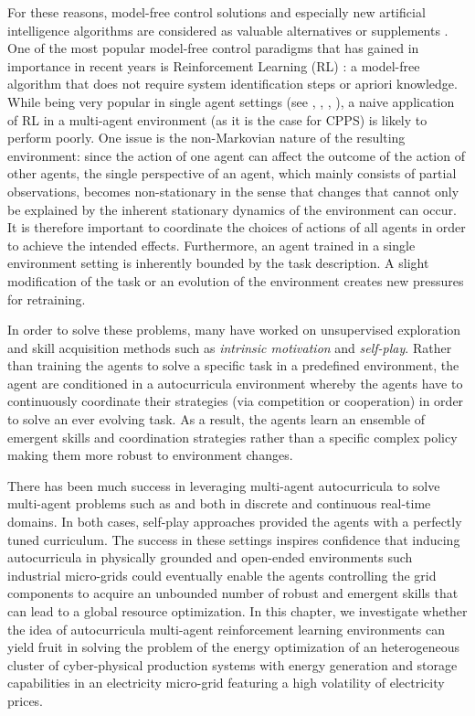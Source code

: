 For these reasons, model-free control solutions and especially new artificial intelligence algorithms are considered as valuable alternatives or supplements \cite{Gholian7236921}. One of the most popular model-free control paradigms that has gained in importance in recent years is Reinforcement Learning (RL) \cite{Sutton9780262039246}: a model-free algorithm that does not require system identification steps or apriori knowledge. While being very popular in single agent settings (see \cite{mnih2013playing}, \cite{openai2019solving}, \cite{hausknecht2015deep}, \cite{schulman2017proximal}), a naive application of RL in a multi-agent environment  (as it is the case for CPPS) is likely to perform poorly. One issue is the non-Markovian nature of the resulting environment: since the action of one agent can affect the outcome of the action of other agents, the single perspective of an agent, which mainly consists of partial observations, becomes non-stationary in the sense that changes that cannot only be explained by the inherent stationary dynamics of the environment can occur. It is therefore important to coordinate the choices of actions of all agents in order to achieve the intended effects. Furthermore, an agent trained in a single environment setting is inherently bounded by the task description. A slight modification of the task or an evolution of the environment creates new pressures for retraining.

In order to solve these problems, many have worked on unsupervised exploration and skill acquisition methods such as \textit{intrinsic motivation} and \textit{self-play}. Rather than training the agents to solve a specific task in a predefined environment, the agent are conditioned in a autocurricula environment whereby the agents have to continuously coordinate their strategies (via competition or cooperation) in order to solve an ever evolving task. As a result, the agents learn an ensemble of emergent skills and coordination strategies rather than a specific complex policy making them more robust to environment changes.

There has been much success in leveraging multi-agent autocurricula to solve multi-agent problems such as \cite{lowe2017multiagent} and \cite{bansal2017emergent} both in discrete and continuous real-time domains. In both cases, self-play approaches provided the agents with a perfectly tuned curriculum. The success in these settings inspires confidence that inducing autocurricula in physically grounded and open-ended environments such industrial micro-grids could eventually enable the agents controlling the grid components to acquire an unbounded number of robust and emergent skills that can lead to a global resource optimization. In this chapter, we investigate whether the idea of autocurricula multi-agent reinforcement learning environments can yield fruit in solving the problem of the energy optimization of an heterogeneous cluster of cyber-physical production systems with energy generation and storage capabilities in an electricity micro-grid featuring a high volatility of electricity prices.

